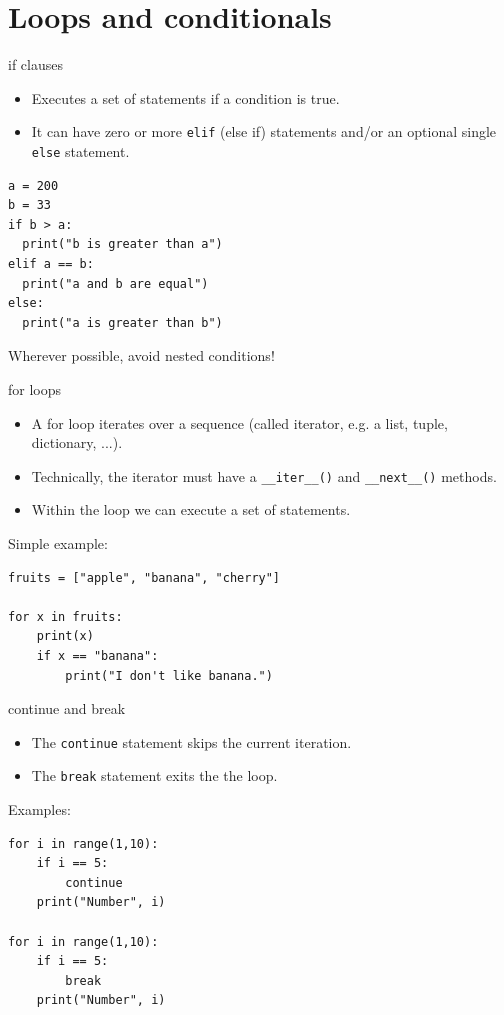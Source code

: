 \documentclass[compress%
,aspectratio=169%
]{beamer}
\newcommand{\code}{\lstinline}
\begin{document}
\section{Loops and conditionals}



\begin{frame}[fragile]{if clauses}
\begin{itemize}
    \item Executes a set of statements if a condition is true.
    \item It can have zero or more \code|elif| (else if) statements and/or an optional single \code|else| statement.
\end{itemize}

\begin{lstlisting}
a = 200
b = 33
if b > a:
  print("b is greater than a")
elif a == b:
  print("a and b are equal")
else:
  print("a is greater than b")
\end{lstlisting}
\alert{Wherever possible, avoid nested conditions!}
\end{frame}




\begin{frame}[fragile]{for loops}

\begin{itemize}
    \item A for loop iterates over a sequence (called iterator, e.g. a list, tuple, dictionary, ...).
    \item Technically, the iterator must have a \lstinline{__iter__()} and \lstinline{__next__()} methods.
    \item Within the loop we can execute a set of statements.
\end{itemize}

Simple example:
\begin{lstlisting}
fruits = ["apple", "banana", "cherry"]

for x in fruits:
    print(x)
    if x == "banana":
        print("I don't like banana.")
\end{lstlisting}

\end{frame}

\begin{frame}[fragile]{continue and break}

\begin{itemize}
    \item The \code|continue| statement skips the current iteration.
    \item The \code|break| statement exits the the loop.
\end{itemize}

Examples:
\begin{lstlisting}
for i in range(1,10):
    if i == 5:
        continue
    print("Number", i)

for i in range(1,10):
    if i == 5:
        break
    print("Number", i)
\end{lstlisting}

\end{frame}
\end{document}
